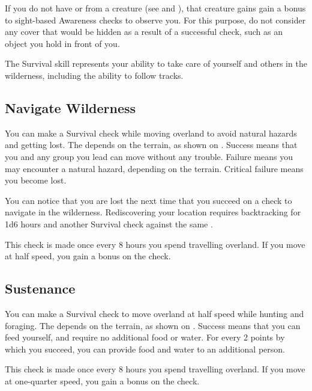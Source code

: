         If you do not have  or  from a creature (see  and ), that creature gains gain a  bonus to sight-based Awareness checks to observe you.
        For this purpose, do not consider any cover that would be hidden as a result of a successful check, such as an object you hold in front of you.

\newpage
{}
        The Survival skill represents your ability to take care of yourself and others in the wilderness, including the ability to follow tracks.

    \subsection{Navigate Wilderness}
        You can make a Survival check while moving overland to avoid natural hazards and getting lost. The  depends on the terrain, as shown on . Success means that you and any group you lead can move without any trouble. Failure means you may encounter a natural hazard, depending on the terrain. Critical failure means you become lost.

        You can notice that you are lost the next time that you succeed on a check to navigate in the wilderness. Rediscovering your location requires backtracking for 1d6 hours and another Survival check against the same .

        This check is made once every 8 hours you spend travelling overland. If you move at half speed, you gain a  bonus on the check.

    \subsection{Sustenance}
        You can make a Survival check to move overland at half speed while hunting and foraging. The  depends on the terrain, as shown on . Success means that you can feed yourself, and require no additional food or water. For every 2 points by which you succeed, you can provide food and water to an additional person.

        This check is made once every 8 hours you spend travelling overland. If you move at one-quarter speed, you gain a  bonus on the check.

